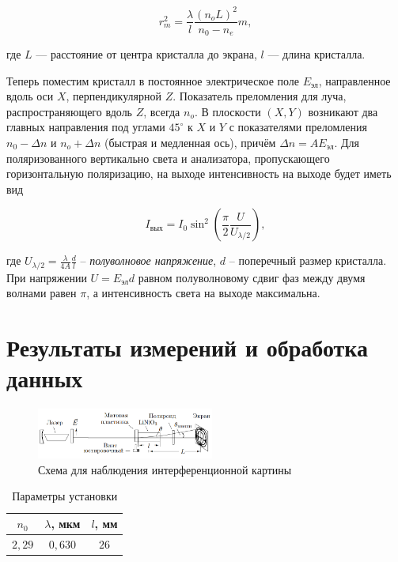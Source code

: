 \documentclass[a4paper]{article}
\begin{document}
\begin{equation}
r_m^2 = \dfrac{\lambda}{l} \dfrac{(n_oL)^2}{n_0 - n_e}m,
\end{equation}

\noindent где $L$ --- расстояние от центра кристалла до экрана, $l$ --- длина кристалла. \medskip


\noindent Теперь поместим кристалл в постоянное электрическое поле $E_{\text{эл}}$, направленное вдоль оси $X$, перпендикулярной $Z$. Показатель преломления для луча, распространяющего вдоль $Z$, всегда $n_o$. В плоскости $(X,Y)$ возникают два главных направления под углами $45^\circ$ к $X$ и $Y$ с показателями преломления $n_0 - \Delta n$ и $n_o + \Delta n$ (быстрая и медленная ось), причём $\Delta n = A E_{\text{эл}}$. Для поляризованного вертикально света и анализатора, пропускающего горизонтальную поляризацию, на выходе интенсивность на выходе будет иметь вид

\begin{equation}
I_{\text{вых}} = I_0 \sin^2 \left(\dfrac{\pi}{2} \dfrac{U}{U_{\lambda/2}} \right),
\end{equation}

\noindent где $U_{\lambda/2} = \frac{\lambda}{4A}\frac{d}{l}$ -- \textit{полуволновое напряжение}, $d$ -- поперечный размер кристалла.  При напряжении $U = E_{\text{эл}}d$ равном полуволновому сдвиг фаз между двумя волнами равен $\pi$, а интенсивность света на выходе максимальна. 

\section{Результаты измерений и обработка данных}

\begin{figure}[ht!]
    \centering
    \includegraphics[width = 0.52\textwidth]{image/pic1.png}
    \caption{Схема для наблюдения интерференционной картины}
\end{figure}

\begin{table}[!ht]
    \centering
    \caption{Параметры установки}
    \begin{tabular}{|c|c|c|}
    \hline
    $n_0$  & $\lambda$, мкм & $l$, мм \\ \hline
    $2,29$ & $0,630$        & $26$    \\ \hline
    \end{tabular}
\end{table}
\end{document}
